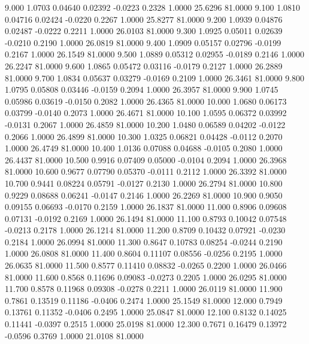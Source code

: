    9.000   1.0703   0.04640   0.02392  -0.0223   0.2328   1.0000  25.6296  81.0000
   9.100   1.0810   0.04716   0.02424  -0.0220   0.2267   1.0000  25.8277  81.0000
   9.200   1.0939   0.04876   0.02487  -0.0222   0.2211   1.0000  26.0103  81.0000
   9.300   1.0925   0.05011   0.02639  -0.0210   0.2190   1.0000  26.0819  81.0000
   9.400   1.0909   0.05157   0.02796  -0.0199   0.2167   1.0000  26.1549  81.0000
   9.500   1.0889   0.05312   0.02955  -0.0189   0.2146   1.0000  26.2247  81.0000
   9.600   1.0865   0.05472   0.03116  -0.0179   0.2127   1.0000  26.2889  81.0000
   9.700   1.0834   0.05637   0.03279  -0.0169   0.2109   1.0000  26.3461  81.0000
   9.800   1.0795   0.05808   0.03446  -0.0159   0.2094   1.0000  26.3957  81.0000
   9.900   1.0745   0.05986   0.03619  -0.0150   0.2082   1.0000  26.4365  81.0000
  10.000   1.0680   0.06173   0.03799  -0.0140   0.2073   1.0000  26.4671  81.0000
  10.100   1.0595   0.06372   0.03992  -0.0131   0.2067   1.0000  26.4859  81.0000
  10.200   1.0480   0.06589   0.04202  -0.0122   0.2066   1.0000  26.4899  81.0000
  10.300   1.0325   0.06821   0.04428  -0.0112   0.2070   1.0000  26.4749  81.0000
  10.400   1.0136   0.07088   0.04688  -0.0105   0.2080   1.0000  26.4437  81.0000
  10.500   0.9916   0.07409   0.05000  -0.0104   0.2094   1.0000  26.3968  81.0000
  10.600   0.9677   0.07790   0.05370  -0.0111   0.2112   1.0000  26.3392  81.0000
  10.700   0.9441   0.08224   0.05791  -0.0127   0.2130   1.0000  26.2794  81.0000
  10.800   0.9229   0.08688   0.06241  -0.0147   0.2146   1.0000  26.2269  81.0000
  10.900   0.9050   0.09155   0.06693  -0.0170   0.2159   1.0000  26.1837  81.0000
  11.000   0.8906   0.09608   0.07131  -0.0192   0.2169   1.0000  26.1494  81.0000
  11.100   0.8793   0.10042   0.07548  -0.0213   0.2178   1.0000  26.1214  81.0000
  11.200   0.8709   0.10432   0.07921  -0.0230   0.2184   1.0000  26.0994  81.0000
  11.300   0.8647   0.10783   0.08254  -0.0244   0.2190   1.0000  26.0808  81.0000
  11.400   0.8604   0.11107   0.08556  -0.0256   0.2195   1.0000  26.0635  81.0000
  11.500   0.8577   0.11410   0.08832  -0.0265   0.2200   1.0000  26.0466  81.0000
  11.600   0.8568   0.11696   0.09083  -0.0273   0.2205   1.0000  26.0295  81.0000
  11.700   0.8578   0.11968   0.09308  -0.0278   0.2211   1.0000  26.0119  81.0000
  11.900   0.7861   0.13519   0.11186  -0.0406   0.2474   1.0000  25.1549  81.0000
  12.000   0.7949   0.13761   0.11352  -0.0406   0.2495   1.0000  25.0847  81.0000
  12.100   0.8132   0.14025   0.11441  -0.0397   0.2515   1.0000  25.0198  81.0000
  12.300   0.7671   0.16479   0.13972  -0.0596   0.3769   1.0000  21.0108  81.0000
